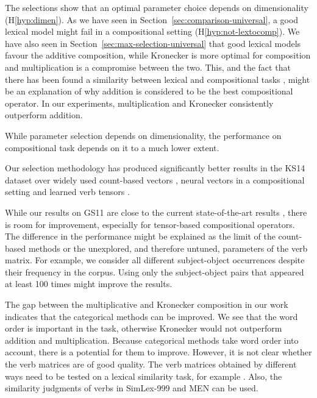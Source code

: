 The selections show that an optimal parameter choice depends on dimensionality (H\ref{hyp:dimen}). As we have seen in Section~\ref{sec:comparison-universal}, a good lexical model might fail in a compositional setting (H\ref{hyp:not-lextocomp}). We have also seen in Section~\ref{sec:max-selection-universal} that good lexical models favour the additive composition, while Kronecker is more optimal for composition and multiplication is a compromise between the two. This, and the fact that there has been found a similarity between lexical and compositional tasks \cite[\textcolor{citecolor}{Section~4}]{kiela-clark:2014:CVSC}, might be an explanation of why addition is considered to be the best compositional operator. In our experiments, multiplication and Kronecker consistently outperform addition.

While parameter selection depends on dimensionality, the performance on compositional task depends on it to a much lower extent.

Our selection methodology has produced significantly better results in the KS14 dataset over widely used count-based vectors \cite{milajevs-EtAl:2014:EMNLP2014}, neural vectors in a compositional setting \cite{milajevs-EtAl:2014:EMNLP2014,kim2015neural} and learned verb tensors \cite{fried-polajnar-clark:2015:ACL-IJCNLP,hashimoto-tsuruoka:2016:P16-1,hashimoto-tsuruoka:2015:CVSC}.

While our results on GS11 are close to the current state-of-the-art results \cite{hashimoto-tsuruoka:2016:P16-1}, there is room for improvement, especially for tensor-based compositional operators. The difference in the performance might be explained as the limit of the count-based methods or the unexplored, and therefore untuned, parameters of the verb matrix. For example, we consider all different subject-object occurrences despite their frequency in the corpus. Using only the subject-object pairs that appeared at least 100 times might improve the results.

The gap between the multiplicative and Kronecker composition in our work indicates that the categorical methods can be improved. We see that the word order is important in the task, otherwise Kronecker would not outperform addition and multiplication. Because categorical methods take word order into account, there is a potential for them to improve. However, it is not clear whether the verb matrices are of good quality. The verb matrices obtained by different ways need to be tested on a lexical similarity task, for example . Also, the similarity judgments of verbs in SimLex-999 and MEN can be used.



